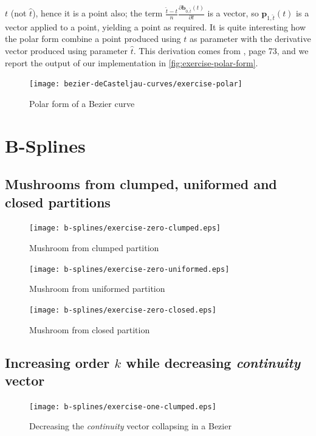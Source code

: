 \documentclass{article}
\begin{document}
$t$ (not $\hat{t}$), hence it is a point also; the term 
        $\frac{\hat{t}-t}{n}\frac{\partial \mathbf{b}_{0, \hat{t}}(t) }{\partial t} $
is a vector, so $\mathbf{p}_{1, \hat{t}}(t)$ is a vector applied to a point, yielding a point
as required. It is quite interesting how the polar form combine a point produced using $t$
as parameter with the derivative vector produced using  parameter $\hat{t}$. This derivation
comes from \cite{Farin}, page 73, and we report the output of our implementation in
\autoref{fig:exercise-polar-form}.
\begin{figure}
  \centering
  \texttt{[image: bezier-deCasteljau-curves/exercise-polar]}
  \caption{Polar form of a Bezier curve}
  \label{fig:exercise-polar-form}
\end{figure}


\section{B-Splines}

\subsection{Mushrooms from clumped, uniformed and closed partitions}
\begin{figure}
  \centering
  \texttt{[image: b-splines/exercise-zero-clumped.eps]}
  \caption{Mushroom from clumped partition}
  \label{fig:clumpled-mushroom}
\end{figure}

\begin{figure}
  \centering
  \texttt{[image: b-splines/exercise-zero-uniformed.eps]}
  \caption{Mushroom from uniformed partition}
  \label{fig:uniformed-mushroom}
\end{figure}

\begin{figure}
  \centering
  \texttt{[image: b-splines/exercise-zero-closed.eps]}
  \caption{Mushroom from closed partition}
  \label{fig:closed-mushroom}
\end{figure}

\subsection{Increasing order $k$ while decreasing \emph{continuity} vector }
\begin{figure}
  \centering
  \texttt{[image: b-splines/exercise-one-clumped.eps]}
  \caption{Decreasing the \emph{continuity} vector collapsing in a Bezier }
  \label{fig:bspline-exercise-one-clumped}
\end{figure}
\end{document}
